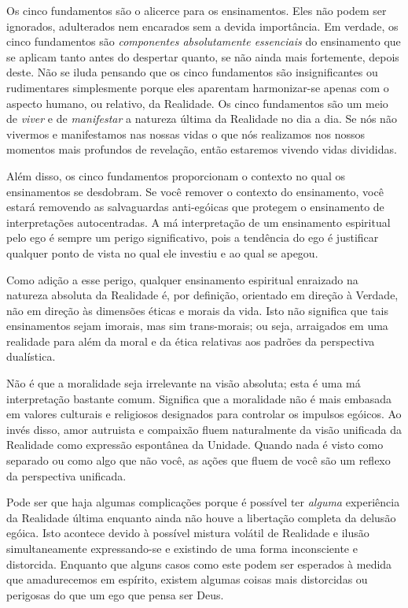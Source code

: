 Os cinco fundamentos são o alicerce para os ensinamentos. Eles não podem ser ignorados, adulterados nem encarados sem a devida importância. Em verdade, os cinco fundamentos são \emph{componentes absolutamente essenciais} do ensinamento que se aplicam tanto antes do despertar quanto, se não ainda mais fortemente, depois deste. Não se iluda pensando que os cinco fundamentos são insignificantes ou rudimentares simplesmente porque eles aparentam harmonizar-se apenas com o aspecto humano, ou relativo, da Realidade. Os cinco fundamentos são um meio de \emph{viver} e de \emph{manifestar} a natureza última da Realidade no dia a dia. Se nós não vivermos e manifestamos nas nossas vidas o que nós realizamos nos nossos momentos mais profundos de revelação, então estaremos vivendo vidas divididas.

Além disso, os cinco fundamentos proporcionam o contexto no qual os ensinamentos se desdobram. Se você remover o contexto do ensinamento, você estará removendo as salvaguardas anti-egóicas que protegem o ensinamento de interpretações autocentradas. A má interpretação de um ensinamento espiritual pelo ego é sempre um perigo significativo, pois a tendência do ego é justificar qualquer ponto de vista no qual ele investiu e ao qual se apegou.

Como adição a esse perigo, qualquer ensinamento espiritual enraizado na natureza absoluta da Realidade é, por definição, orientado em direção à Verdade, não em direção às dimensões éticas e morais da vida. Isto não significa que tais ensinamentos sejam imorais, mas sim trans-morais; ou seja, arraigados em uma realidade para além da moral e da ética relativas aos padrões da perspectiva dualística.

Não é que a moralidade seja irrelevante na visão absoluta; esta é uma má interpretação bastante comum. Significa que a moralidade não é mais embasada em valores culturais e religiosos designados para controlar os impulsos egóicos. Ao invés disso, amor autruista e compaixão fluem naturalmente da visão unificada da Realidade como expressão espontânea da Unidade. Quando nada é visto como separado ou como algo que não você, as ações que fluem de você são um reflexo da perspectiva unificada.

Pode ser que haja algumas complicações porque é possível ter \emph{alguma} experiência da Realidade última enquanto ainda não houve a libertação completa da delusão egóica. Isto acontece devido à possível mistura volátil de Realidade e ilusão simultaneamente expressando-se e existindo de uma forma inconsciente e distorcida. Enquanto que alguns casos como este podem ser esperados à medida que amadurecemos em espírito, existem algumas coisas mais distorcidas ou perigosas do que um ego que pensa ser Deus.

